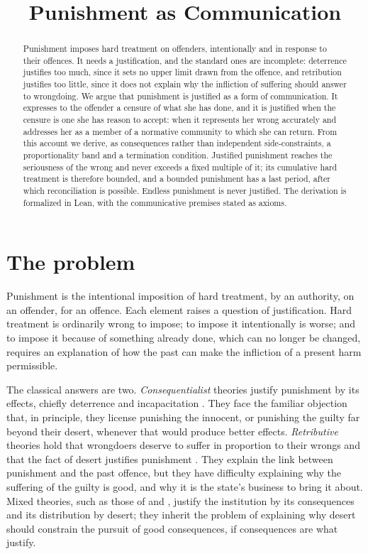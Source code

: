 \documentclass{situationist-preprint}
\title{Punishment as Communication}
\begin{document}
\maketitle

\begin{abstract}
Punishment imposes hard treatment on offenders, intentionally and in response to their offences. It needs a justification, and the standard ones are incomplete: deterrence justifies too much, since it sets no upper limit drawn from the offence, and retribution justifies too little, since it does not explain why the infliction of suffering should answer to wrongdoing. We argue that punishment is justified as a form of communication. It expresses to the offender a censure of what she has done, and it is justified when the censure is one she has reason to accept: when it represents her wrong accurately and addresses her as a member of a normative community to which she can return. From this account we derive, as consequences rather than independent side-constraints, a proportionality band and a termination condition. Justified punishment reaches the seriousness of the wrong and never exceeds a fixed multiple of it; its cumulative hard treatment is therefore bounded, and a bounded punishment has a last period, after which reconciliation is possible. Endless punishment is never justified. The derivation is formalized in Lean, with the communicative premises stated as axioms.
\end{abstract}

\section{The problem}

Punishment is the intentional imposition of hard treatment, by an authority, on an offender, for an offence. Each element raises a question of justification. Hard treatment is ordinarily wrong to impose; to impose it intentionally is worse; and to impose it because of something already done, which can no longer be changed, requires an explanation of how the past can make the infliction of a present harm permissible.

The classical answers are two. \emph{Consequentialist} theories justify punishment by its effects, chiefly deterrence and incapacitation \citep{Bentham1789}. They face the familiar objection that, in principle, they license punishing the innocent, or punishing the guilty far beyond their desert, whenever that would produce better effects. \emph{Retributive} theories hold that wrongdoers deserve to suffer in proportion to their wrongs and that the fact of desert justifies punishment \citep{Kant1797,Moore1997}. They explain the link between punishment and the past offence, but they have difficulty explaining why the suffering of the guilty is good, and why it is the state's business to bring it about. Mixed theories, such as those of \citet{Rawls1955} and \citet{Hart1968}, justify the institution by its consequences and its distribution by desert; they inherit the problem of explaining why desert should constrain the pursuit of good consequences, if consequences are what justify.
\end{document}
